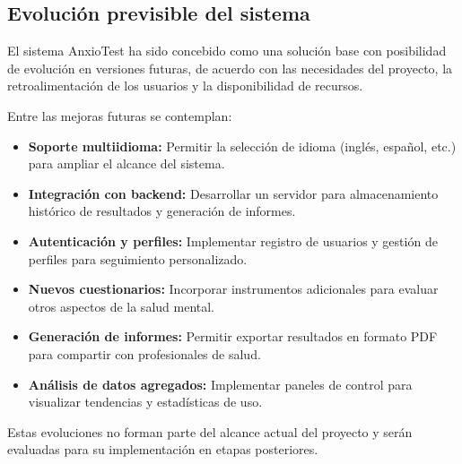 \subsection{Evolución previsible del sistema}
\label{sec:evolucion}

El sistema AnxioTest ha sido concebido como una solución base con posibilidad de evolución en versiones futuras, de acuerdo con las necesidades del proyecto, la retroalimentación de los usuarios y la disponibilidad de recursos.

Entre las mejoras futuras se contemplan:

\begin{itemize}
  \item \textbf{Soporte multiidioma:} Permitir la selección de idioma (inglés, español, etc.) para ampliar el alcance del sistema.
  \item \textbf{Integración con backend:} Desarrollar un servidor para almacenamiento histórico de resultados y generación de informes.
  \item \textbf{Autenticación y perfiles:} Implementar registro de usuarios y gestión de perfiles para seguimiento personalizado.
  \item \textbf{Nuevos cuestionarios:} Incorporar instrumentos adicionales para evaluar otros aspectos de la salud mental.
  \item \textbf{Generación de informes:} Permitir exportar resultados en formato PDF para compartir con profesionales de salud.
  \item \textbf{Análisis de datos agregados:} Implementar paneles de control para visualizar tendencias y estadísticas de uso.
\end{itemize}

Estas evoluciones no forman parte del alcance actual del proyecto y serán evaluadas para su implementación en etapas posteriores.